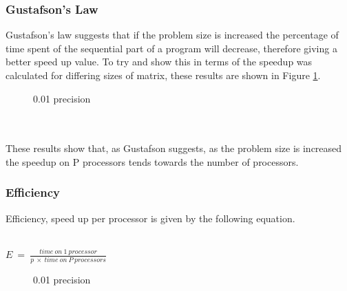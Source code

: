 \documentclass{article}
\begin{document}
\subsubsection{Gustafson’s Law}

Gustafson's law suggests that if the problem size is increased the percentage of time
spent of the sequential part of a program will decrease, therefore giving a better
speed up value. To try and show this in terms of the speedup was calculated for
differing sizes of matrix, these results are shown in Figure \ref{fig:gustafson}.

\begin{figure}[H]
 \centering
 \caption{0.01 precision}
 \label{fig:gustafson}
\end{figure}\\~\\

These results show that, as Gustafson suggests, as the problem size is increased
the speedup on P processors tends towards the number of processors.

\subsubsection{Efficiency}

Efficiency, speed up per processor is given by the following equation.\\~\\

\begin{center}
$E\ =\ \frac{time\ on\ 1\ processor}{p\ \times\ time\ on\ P\ processors}$
\end{center}

\begin{figure}[H]
 \centering
 \caption{0.01 precision}
 \label{fig:efficiency}
\end{figure}\\~\\
\end{document}

